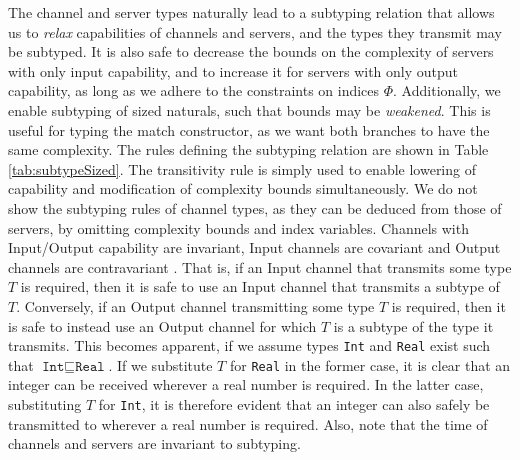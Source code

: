 The channel and server types naturally lead to a subtyping relation that allows us to \textit{relax} capabilities of channels and servers, and the types they transmit may be subtyped. It is also safe to decrease the bounds on the complexity of servers with only input capability, and to increase it for servers with only output capability, as long as we adhere to the constraints on indices $\Phi$. Additionally, we enable subtyping of sized naturals, such that bounds may be \textit{weakened}. This is useful for typing the match constructor, as we want both branches to have the same complexity. The rules defining the subtyping relation are shown in Table \ref{tab:subtypeSized}. The transitivity rule is simply used to enable lowering of capability and modification of complexity bounds simultaneously. We do not show the subtyping rules of channel types, as they can be deduced from those of servers, by omitting complexity bounds and index variables. Channels with Input/Output capability are invariant, Input channels are covariant and Output channels are contravariant \cite{PierceSangiorgi1996}. That is, if an Input channel that transmits some type $T$ is required, then it is safe to use an Input channel that transmits a subtype of $T$. Conversely, if an Output channel transmitting some type $T$ is required, then it is safe to instead use an Output channel for which $T$ is a subtype of the type it transmits. This becomes apparent, if we assume types \texttt{Int} and \texttt{Real} exist such that $\texttt{Int} \sqsubseteq \texttt{Real}$. If we substitute $T$ for \texttt{Real} in the former case, it is clear that an integer can be received wherever a real number is required. In the latter case, substituting $T$ for \texttt{Int}, it is therefore evident that an integer can also safely be transmitted to wherever a real number is required. Also, note that the time of channels and servers are invariant to subtyping.\\

